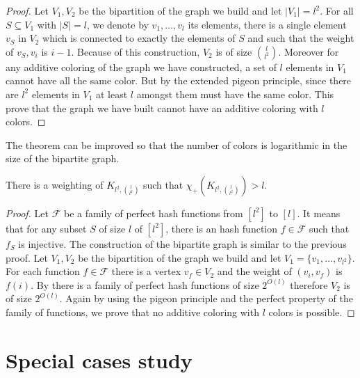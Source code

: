 \documentclass{article}
\begin{document}
\begin{proof}
Let $V_1, V_2$ be the bipartition of the graph we build and let $|V_1| = l^2$. 
For all $S \subseteq V_1$ with $|S| = l$, we denote by $v_1,\dots,v_l$ its elements,
there is a single element $v_S$ in $V_2$ which is connected to exactly the elements of $S$
and such that the weight of $v_S,v_i$ is $i-1$. Because of this construction, $V_2$ is of size
$\binom{l}{l^2}$. Moreover for any additive coloring of the graph we have constructed,
a set of $l$ elements in $V_1$ cannot have all the same color. But by the extended pigeon principle, since there 
are $l^2$ elements in $V_1$ at least $l$ amongst them must have the same color. 
This prove that the graph we have built cannot have an additive coloring with $l$ colors.
\end{proof}

The theorem can be improved so that the number of colors is logarithmic in 
the size of the bipartite graph.

\begin{theorem}
 There is a weighting of $K_{l^2,\binom{l}{l^2}}$ such that 
 $\chi_{+}(K_{l^2,\binom{l}{l^2}}) > l$.
\end{theorem}

\begin{proof}
 Let $\mathcal{F}$ be a family of perfect  hash functions from $[l^2]$ to $[l]$. It means that for any 
 subset $S$ of size $l$ of $[l^2]$, there is an hash function $f \in \mathcal{F}$ such that $f_S$ is injective.
 The construction of the bipartite graph is similar to the previous proof. 
 Let $V_1, V_2$ be the bipartition of the graph we build and let $V_1 = \{v_1,\dots,v_{l^2}\}$. 
 For each function $f \in \mathcal{F}$ there is a vertex $v_f \in V_2$ and the weight of $(v_i,v_f)$ is $f(i)$.
 By \cite{schmidt1990spatial,alon1995color} there is a family of perfect hash functions of size $2^{O(l)}$ therefore $V_2$ is of size $2^{O(l)}$.
 Again by using the pigeon principle and the perfect property of the family of functions, we prove that no additive coloring with $l$ colors is possible.
\end{proof}



\section{Special cases study}
\end{document}
